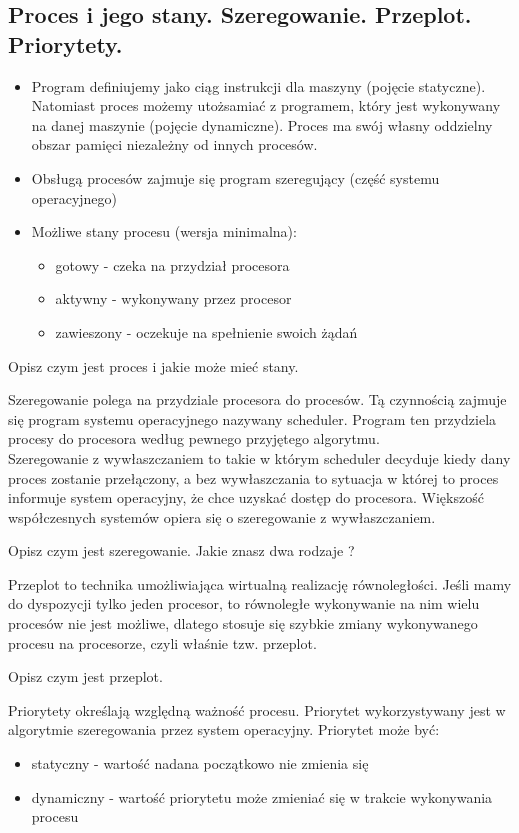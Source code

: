 \documentclass[a4paper,15pt]{article}
\newcommand{\ask}[2]{
    \begin{tcolorbox}[colback=black!5!white,colframe=gray,title={Pytanie #1}]
        #2
    \end{tcolorbox}
}
\begin{document}
\subsection{Proces i jego stany. Szeregowanie. Przeplot. Priorytety.}
\begin{itemize}
\item Program definiujemy jako ciąg instrukcji dla maszyny (pojęcie statyczne). Natomiast proces możemy utożsamiać z programem, który jest wykonywany na danej maszynie (pojęcie dynamiczne). Proces ma swój własny oddzielny obszar pamięci niezależny od innych procesów.
\item Obsługą procesów zajmuje się program szeregujący (część systemu operacyjnego)
\item Możliwe stany procesu (wersja minimalna):
\begin{itemize}
\item gotowy - czeka na przydział procesora
\item aktywny - wykonywany przez procesor
\item zawieszony - oczekuje na spełnienie swoich żądań
\end{itemize}
\end{itemize}

\ask{}{
Opisz czym jest proces i jakie może mieć stany.
}

Szeregowanie polega na przydziale procesora do procesów. Tą czynnością zajmuje się program systemu operacyjnego nazywany scheduler. Program ten przydziela procesy do procesora według pewnego przyjętego algorytmu. \\
Szeregowanie z wywłaszczaniem to takie w którym scheduler decyduje kiedy dany proces zostanie przełączony, a bez wywłaszczania to sytuacja w której to proces informuje system operacyjny, że chce uzyskać dostęp do procesora. Większość współczesnych systemów opiera się o szeregowanie z wywłaszczaniem. 

\ask{}{
Opisz czym jest szeregowanie. Jakie znasz dwa rodzaje ?
}


Przeplot to technika umożliwiająca wirtualną realizację równoległości. Jeśli mamy do dyspozycji tylko jeden procesor, to równoległe wykonywanie na nim wielu procesów nie jest możliwe, dlatego stosuje się szybkie zmiany wykonywanego procesu na procesorze, czyli właśnie tzw. przeplot. 

\ask{}{
Opisz czym jest przeplot.
}

Priorytety określają względną ważność procesu. Priorytet wykorzystywany jest w algorytmie szeregowania przez system operacyjny. Priorytet może być:
\begin{itemize}
\item statyczny - wartość nadana początkowo nie zmienia się
\item dynamiczny - wartość priorytetu może zmieniać się w trakcie wykonywania procesu
\end{itemize}
\end{document}
